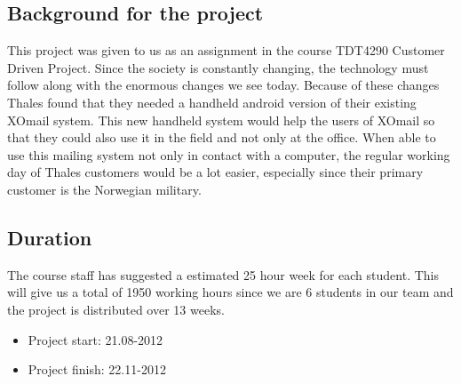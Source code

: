 \subsection{Background for the project}
This project was given to us as an assignment in the course TDT4290 Customer Driven Project. Since the society is constantly changing, the technology must follow along with the enormous changes we see today. Because of these changes Thales found that they needed a handheld android version of their existing XOmail system. This new handheld system would help the users of XOmail so that they could also use it in the field and not only at the office. When able to use this mailing system not only in contact with a computer, the regular working day of Thales customers would be a lot easier, especially since their primary customer is the Norwegian military.



\subsection{Duration}
The course staff has suggested a estimated 25 hour week for each student. This will give us a total of 1950 working hours since we are 6 students in our team and the project is distributed over 13 weeks.

\begin{itemize}
\item{}Project start: 21.08-2012
\item{}Project finish: 22.11-2012
\end{itemize}

